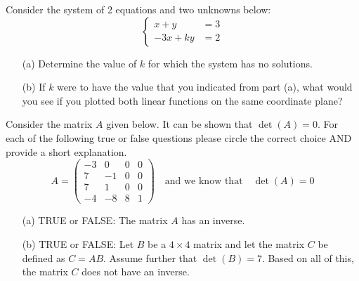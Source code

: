 \begin{problem}
    Consider the system of 2 equations and two unknowns below: 
\[ \left\{ \begin{array}{rl} x+y &= 3 \\ -3x+ky &= 2 \end{array}
    \right. \]
    \begin{enumerate}
        \item[(a)] Determine the value of $k$ for which the system has no solutions.
    
\item[(b)] If $k$ were to have the value that you indicated  from part (a), what would you
see if you plotted both linear functions on the same coordinate plane?
\end{enumerate}
\end{problem}

\begin{problem}
Consider the matrix $A$ given below.  It can be shown that $\det(A) = 0$.  For
each of the following true or false questions please circle the correct choice AND provide
a short explanation.
\[ A = \begin{pmatrix} -3 & 0 & 0 & 0 \\ 7 & -1 & 0 & 0 \\ 7 & 1 & 0 & 0 \\ -4 & -8 & 8 &
    1 \end{pmatrix} \quad \text{and we know that} \quad \det(A) = 0 \]
    \begin{enumerate}
        \item[(a)] TRUE or FALSE: \quad The matrix $A$ has an inverse.

\item[(b)] TRUE or FALSE: \quad Let $B$ be a $4 \times 4$ matrix and let the matrix $C$
    be defined as $C = AB$.  Assume further that $\det(B) = 7$.  Based on all of this, the
    matrix $C$ does not have an inverse.
\end{enumerate}
\end{problem}

